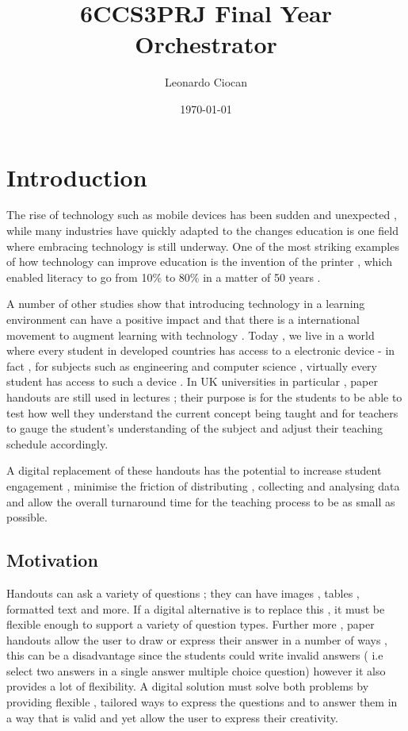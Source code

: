 \documentclass[11pt]{informatics-report}
\title{6CCS3PRJ Final Year\\\vspace{0.2cm}Orchestrator}
\author{Leonardo Ciocan}
\date{\today}
\begin{document}
\createFrontMatter
\doublespacing
\tableofcontents
\doublespacing


\chapter{Introduction}
The rise of technology such as mobile devices has been sudden and unexpected , while many industries have quickly adapted to the changes education is one field where embracing technology is still underway. One of the most striking examples of how technology can improve education is the invention of the printer , which enabled literacy to go from 10\% to 80\% in a matter of 50 years \cite{printing}.

A number of other studies show that introducing technology in a learning environment can have a positive impact \cite{tech} and that there is a international movement to augment learning with technology \cite{tech2}.
Today , we live in a world where every student in developed countries has access to a electronic device - in fact , for subjects such as engineering and computer science , virtually every student has access to such a device \cite{laptop1} \cite{laptop2} . In UK universities in particular , paper handouts are still used in lectures ; their purpose is for the students to be able to test how well they understand the current concept being taught and for teachers to gauge the student's understanding of the subject and adjust their teaching schedule accordingly.

A digital replacement of these handouts has the potential to increase student engagement , minimise the friction of distributing , collecting and analysing data and allow the overall turnaround time for the teaching process to be as small as possible.

\section{Motivation}
Handouts can ask a variety of questions ; they can have images , tables , formatted text and more. If a digital alternative is to replace this , it must be flexible enough to support a variety of question types. Further more , paper handouts allow the user to draw or express their answer in a number of ways  , this can be a disadvantage since the students could write invalid answers ( i.e select two answers in a single answer multiple choice question) however it also provides a lot of flexibility. A digital solution must solve both problems by providing flexible , tailored ways to express the questions and to answer them in a way that is valid and yet allow the user to express their creativity.
\end{document}
